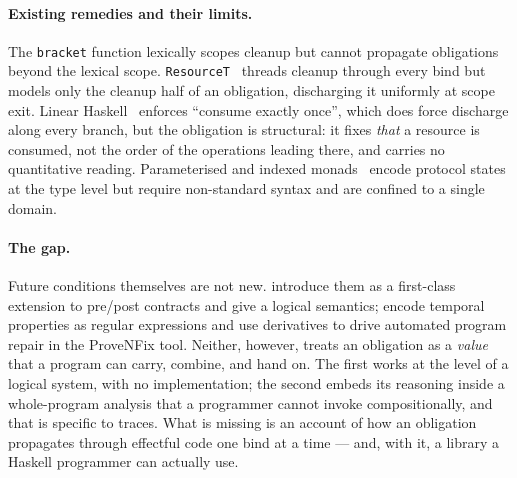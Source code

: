 \documentclass[acmsmall,screen]{acmart}
\begin{document}
\paragraph{Existing remedies and their limits.}
The \lstinline{bracket} function lexically scopes cleanup but cannot
propagate obligations beyond the lexical scope.
\lstinline{ResourceT}~\cite{snoyman2011resourcet} threads cleanup through
every bind but models only the cleanup half of an obligation, discharging
it uniformly at scope exit.
Linear Haskell~\cite{bernardy2018linear} enforces ``consume exactly once'',
which does force discharge along every branch, but the obligation is
structural: it fixes \emph{that} a resource is consumed, not the order of the
operations leading there, and carries no quantitative reading.
Parameterised and indexed monads~\cite{atkey2009} encode protocol states at
the type level but require non-standard syntax and are confined to a single
domain.

\paragraph{The gap.}
Future conditions themselves are not new.
\citet{song2025futurecond} introduce them as a first-class extension to
pre/post contracts and give a logical semantics;
\citet{song2024provenfix} encode temporal properties as regular expressions
and use derivatives to drive automated program repair in the ProveNFix tool.
Neither, however, treats an obligation as a \emph{value} that a program can
carry, combine, and hand on.
The first works at the level of a logical system, with no implementation;
the second embeds its reasoning inside a whole-program analysis that a
programmer cannot invoke compositionally, and that is specific to traces.
What is missing is an account of how an obligation propagates through
effectful code one bind at a time --- and, with it, a library a Haskell
programmer can actually use.
\end{document}
